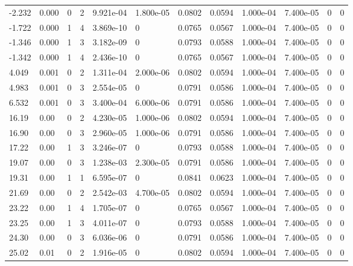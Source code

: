 \documentclass[preview]{standalone}
\begin{document}
{{\begin{tabular}{L{1.2cm}C{1.2cm} C{0.3cm}C{0.5cm} C{1.4cm}C{1.4cm} C{1.4cm}C{1.4cm} C{1.6cm}C{1.6cm} C{1.6cm}C{1.6cm}}
  -2.232  &  0.000  & 0     &  2 &  9.921e-04  & 1.800e-05  &  0.0802&   0.0594& 1.000e-04 & 7.400e-05   &  0 & 0  \\ 
  -1.722  &  0.000  & 1     &  4 &  3.869e-10  & 0  &  0.0765&   0.0567& 1.000e-04 & 7.400e-05   &  0 & 0  \\ 
  -1.346  &  0.000  & 1     &  3 &  3.182e-09  & 0  &  0.0793&   0.0588& 1.000e-04 & 7.400e-05   &  0 & 0  \\ 
  -1.342  &  0.000  & 1     &  4 &  2.436e-10  & 0  &  0.0765&   0.0567& 1.000e-04 & 7.400e-05   &  0 & 0  \\ 
  4.049  &  0.001  & 0     &  2 &  1.311e-04  & 2.000e-06  &  0.0802&   0.0594& 1.000e-04 & 7.400e-05   &  0 & 0  \\ 
  4.983  &  0.001  & 0     &  3 &  2.554e-05  & 0  &  0.0791&   0.0586& 1.000e-04 & 7.400e-05   &  0 & 0  \\ 
  6.532  &  0.001  & 0     &  3 &  3.400e-04  & 6.000e-06  &  0.0791&   0.0586& 1.000e-04 & 7.400e-05   &  0 & 0  \\ 
  16.19  &  0.00  & 0     &  2 &  4.230e-05  & 1.000e-06  &  0.0802&   0.0594& 1.000e-04 & 7.400e-05   &  0 & 0  \\ 
  16.90  &  0.00  & 0     &  3 &  2.960e-05  & 1.000e-06  &  0.0791&   0.0586& 1.000e-04 & 7.400e-05   &  0 & 0  \\ 
  17.22  &  0.00  & 1     &  3 &  3.246e-07  & 0  &  0.0793&   0.0588& 1.000e-04 & 7.400e-05   &  0 & 0  \\ 
  19.07  &  0.00  & 0     &  3 &  1.238e-03  & 2.300e-05  &  0.0791&   0.0586& 1.000e-04 & 7.400e-05   &  0 & 0  \\ 
  19.31  &  0.00  & 1     &  1 &  6.595e-07  & 0  &  0.0841&   0.0623& 1.000e-04 & 7.400e-05   &  0 & 0  \\ 
  21.69  &  0.00  & 0     &  2 &  2.542e-03  & 4.700e-05  &  0.0802&   0.0594& 1.000e-04 & 7.400e-05   &  0 & 0  \\ 
  23.22  &  0.00  & 1     &  4 &  1.705e-07  & 0  &  0.0765&   0.0567& 1.000e-04 & 7.400e-05   &  0 & 0  \\ 
  23.25  &  0.00  & 1     &  3 &  4.011e-07  & 0  &  0.0793&   0.0588& 1.000e-04 & 7.400e-05   &  0 & 0  \\ 
  24.30  &  0.00  & 0     &  3 &  6.036e-06  & 0  &  0.0791&   0.0586& 1.000e-04 & 7.400e-05   &  0 & 0  \\ 
  25.02  &  0.01  & 0     &  2 &  1.916e-05  & 0  &  0.0802&   0.0594& 1.000e-04 & 7.400e-05   &  0 & 0  \\ 

\end{tabular}}}
\end{document}
